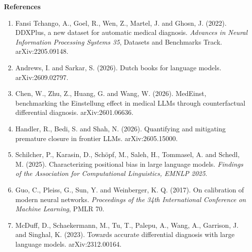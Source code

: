 \documentclass[10pt]{article}
\begin{document}
\vspace{2pt}
\footnotesize
\textbf{References}
\vspace{-4pt}
\begin{enumerate}\setlength{\itemsep}{0pt}\setlength{\parskip}{0pt}\setlength{\leftmargin}{0pt}
\item Fansi Tchango, A., Goel, R., Wen, Z., Martel, J. and Ghosn, J. (2022). DDXPlus,
a new dataset for automatic medical diagnosis. \textit{Advances in Neural Information Processing
Systems 35}, Datasets and Benchmarks Track. arXiv:2205.09148.
\item Andrews, I. and Sarkar, S. (2026). Dutch books for language models. arXiv:2609.02797.
\item Chen, W., Zhu, Z., Huang, G. and Wang, W. (2026). MedEinst, benchmarking the Einstellung
effect in medical LLMs through counterfactual differential diagnosis. arXiv:2601.06636.
\item Handler, R., Bedi, S. and Shah, N. (2026). Quantifying and mitigating premature closure in
frontier LLMs. arXiv:2605.15000.
\item Schilcher, P., Karasin, D., Sch\"opf, M., Saleh, H., Tommasel, A. and Schedl, M. (2025).
Characterizing positional bias in large language models. \textit{Findings of the Association for
Computational Linguistics, EMNLP 2025}.
\item Guo, C., Pleiss, G., Sun, Y. and Weinberger, K. Q. (2017). On calibration of modern
neural networks. \textit{Proceedings of the 34th International Conference on Machine Learning},
PMLR 70.
\item McDuff, D., Schaekermann, M., Tu, T., Palepu, A., Wang, A., Garrison, J. and Singhal, K.
(2023). Towards accurate differential diagnosis with large language models. arXiv:2312.00164.
\end{enumerate}
\end{document}
